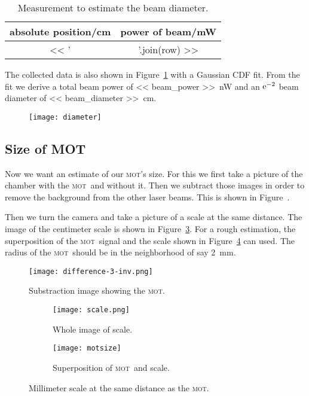 \documentclass[11pt, english, fleqn, DIV=15, headinclude, BCOR=2cm]{scrreprt}
\newcommand\mot{\textsc{mot}}
\begin{document}
\begin{table}
    \centering
    \begin{tabular}{SS}
        \toprule
        {absolute position/\si{\centi\meter}}
        & {power of beam/\si{\milli\watt}} \\
        \midrule
        << ' & '.join(row) >> \\
        \bottomrule
    \end{tabular}
    \caption{%
        Measurement to estimate the beam diameter.
    }
    \label{tab:beam_diameter}
\end{table}

The collected data is also shown in Figure~\ref{fig:diameter} with a Gaussian
CDF fit. From the fit we derive a total beam power of \SI{<< beam_power
>>}{\nano\watt} and an $\mathrm e^{-2}$ beam diameter of \SI{<< beam_diameter
>>}{\centi\meter}.

\begin{figure}
    \centering
    \texttt{[image: diameter]}
    \caption{%
    }
    \label{fig:diameter}
\end{figure}


\subsection{Size of MOT}

Now we want an estimate of our \mot's size. For this we first take a picture of
the chamber with the \mot\ and without it. Then we subtract those images in
order to remove the background from the other laser beams. This is shown in
Figure~\label{fig:difference-3-inv}.

Then we turn the camera and take a picture of a scale at the same distance. The
image of the centimeter scale is shown in Figure~\ref{fig:scale}. For a rough
estimation, the superposition of the \mot\ signal and the scale shown in
Figure~\ref{fig:motsize} can used. The radius of the \mot\ should be in the
neighborhood of say \SI{2}{\milli\meter}.

\begin{figure}
    \centering
    \texttt{[image: difference-3-inv.png]}
    \caption{Substraction image showing the \mot.}
    \label{fig:difference-3-inv}
\end{figure}

\begin{figure}
    \begin{subfigure}{.45\textwidth}
        \centering
        \texttt{[image: scale.png]}
        \caption{Whole image of scale.}
        \label{fig:scale}
    \end{subfigure}
    \hfill
    \begin{subfigure}{.45\textwidth}
        \centering
        \texttt{[image: motsize]}
        \caption{Superposition of \mot\ and scale.}
        \label{fig:motsize}
    \end{subfigure}
    \caption{Millimeter scale at the same distance as the \mot.}
    \label{fig:mot_size}
\end{figure}
\end{document}

